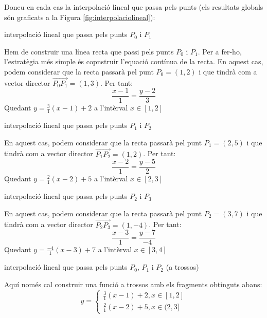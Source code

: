 \begin{llista}

  \item Doneu en cada cas la interpolació lineal que passa pels punts (els resultats globals són graficats a la Figura \ref{fig:interpolaciolineal}):

\begin{llista}

  \item interpolació lineal que passa pels punts $P_0$ i $P_1$

Hem de construir una línea recta que passi pels punts $P_0$ i $P_1$. Per a fer-ho, l'estratègia més simple és copnstruir l'equació contínua de la recta. En aquest cas, podem considerar que la recta passarà pel punt $P_0=(1,2)$ i que tindrà com a vector director $\overrightarrow{P_0P_1}=(1,3)$. Per tant:
\begin{equation}
\frac{x-1}{1}=\frac{y-2}{3}
\end{equation}
Quedant $y=\frac{3}{1}(x-1)+2$ a l'intèrval $x\in[1,2]$
\blacksquare

  \item interpolació lineal que passa pels punts $P_1$ i $P_2$

  En aquest cas, podem considerar que la recta passarà pel punt $P_1=(2,5)$ i que tindrà com a vector director $\overrightarrow{P_1P_2}=(1,2)$. Per tant:
  \begin{equation}
    \frac{x-2}{1}=\frac{y-5}{2}
  \end{equation}
  Quedant $y=\frac{2}{1}(x-2)+5$ a l'intèrval $x\in[2,3]$
  \blacksquare

  \item interpolació lineal que passa pels punts $P_2$ i $P_3$

  En aquest cas, podem considerar que la recta passarà pel punt $P_2=(3,7)$ i que tindrà com a vector director $\overrightarrow{P_2P_3}=(1,-4)$. Per tant:
  \begin{equation}
    \frac{x-3}{1}=\frac{y-7}{-4}
  \end{equation}
  Quedant $y=\frac{-4}{1}(x-3)+7$ a l'intèrval $x\in[3,4]$
  \blacksquare

  \item interpolació lineal que passa pels punts $P_0$, $P_1$ i $P_2$ (a trossos)

  Aquí només cal construir una funció a trossos amb els fragments obtinguts abans:
  \begin{equation}
    y= \begin{cases}
           \frac{3}{1}(x-1)+2 , x \in [1,2]\\
           \frac{2}{1}(x-2)+5 , x \in (2,3]
          \end{cases}
  \end{equation}
  \blacksquare


\end{llista}
\end{llista}

